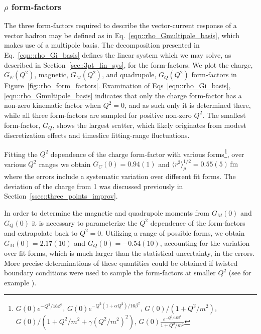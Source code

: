 \documentclass[twocolumn,amsmath,amssymb,prd,10pt,floatfix, 
superscriptaddress,nofootinbib, showpacs, preprintnumbers]{revtex4-1}
\begin{document}
\subsubsection{$\rho$ form-factors}


The three form-factors required to describe the vector-current response of a vector hadron may be defined as in Eq.~\ref{eqn::rho_Gmultipole_basis}, which makes use of a multipole basis. The decomposition presented in Eq.~\ref{eqn::rho_Gi_basis} defines the linear system which we may solve, as described in Section~\ref{sec::3pt_lin_sys}, for the form-factors. We plot the charge, $G_E(Q^2)$, magnetic, $G_M(Q^2)$, and quadrupole, $G_Q(Q^2)$ form-factors in Figure~\ref{fig::rho_form_factors}. Examination of Eqs~\ref{eqn::rho_Gi_basis}, \ref{eqn::rho_Gmultipole_basis} indicates that only the charge form-factor has a non-zero kinematic factor when $Q^2=0$, and as such only it is determined there, while all three form-factors are sampled for positive non-zero $Q^2$. The smallest form-factor, $G_Q$, shows the largest scatter, which likely originates from modest discretization effects and timeslice fitting-range fluctuations.



Fitting the $Q^2$ dependence of the charge form-factor with various forms\footnote{$G(0) e^{-Q^2/16\beta^2}$, $G(0) e^{-Q^2(1+\alpha Q^2)/16\beta^2}$, $G(0)/(1+ Q^2/m^2)$, $G(0)/(1+ Q^2/m^2 + \gamma (Q^2/m^2)^2 )$, $G(0) \frac{e^{-Q^2/16\beta^2}  }{1+Q^2/m^2}$ }, over various $Q^2$ ranges we obtain $G_C(0) = 0.94(1)$ and ${  \langle r^2 \rangle_\rho^{1/2} = 0.55(5) \, \mathrm{fm} }$ where the errors include a systematic variation over different fit forms. The deviation of the charge from 1 was discussed previously in Section~\ref{ssec::three_points_improv}. 

In order to determine the magnetic and quadrupole moments from $G_M(0)$ and $G_Q(0)$ it is necessary to parameterize the $Q^2$ dependence of the form-factors and extrapolate back to $Q^2=0$. Utilizing a range of possible forms, we obtain ${G_M(0) = 2.17(10)}$ and ${G_Q(0) = -0.54(10)}$, accounting for the variation over fit-forms, which is much larger than the statistical uncertainty, in the errors. More precise determinations of these quantities could be obtained if twisted boundary conditions were used to sample the form-factors at smaller $Q^2$ (see for example \cite{Flynn:2005in}).
\end{document}
